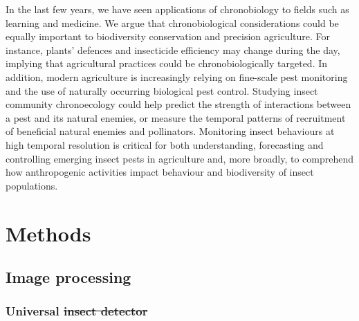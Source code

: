 \documentclass[12pt]{article}
\providecommand{\DIFaddtex}[1]{{\protect\color{blue}\uwave{#1}}} %
\providecommand{\DIFdeltex}[1]{{\protect\color{red}\sout{#1}}}                      %
\providecommand{\DIFaddbegin}{} %
\providecommand{\DIFaddend}{} %
\providecommand{\DIFdelbegin}{} %
\providecommand{\DIFdelend}{} %
\providecommand{\DIFadd}[1]{\texorpdfstring{\DIFaddtex{#1}}{#1}} %
\providecommand{\DIFdel}[1]{\texorpdfstring{\DIFdeltex{#1}}{}} %
\newcommand{\DIFscaledelfig}{0.5}
\newlength{\DIFdelgraphicswidth} %
\newlength{\DIFdelgraphicsheight} %
\newcommand{\DIFaddincludegraphics}[2][]{{\color{blue}\fbox{\DIFOincludegraphics[#1]{#2}}}} %
\newcommand{\DIFdelincludegraphics}[2][]{%
\sbox{\DIFdelgraphicsbox}{\DIFOincludegraphics[#1]{#2}}%
\settoboxwidth{\DIFdelgraphicswidth}{\DIFdelgraphicsbox} %
\settoboxtotalheight{\DIFdelgraphicsheight}{\DIFdelgraphicsbox} %
\scalebox{\DIFscaledelfig}{%
\parbox[b]{\DIFdelgraphicswidth}{\usebox{\DIFdelgraphicsbox}\\[-\baselineskip] \rule{\DIFdelgraphicswidth}{0em}}\llap{\resizebox{\DIFdelgraphicswidth}{\DIFdelgraphicsheight}{%
\setlength{\unitlength}{\DIFdelgraphicswidth}%
\begin{picture}(1,1)%
\thicklines\linethickness{2pt} %
{\color[rgb]{1,0,0}\put(0,0){\framebox(1,1){}}}%
{\color[rgb]{1,0,0}\put(0,0){\line( 1,1){1}}}%
{\color[rgb]{1,0,0}\put(0,1){\line(1,-1){1}}}%
\end{picture}%
}\hspace*{3pt}}} %
} %
\DeclareRobustCommand{\DIFaddbegin}{\DIFOaddbegin \let\includegraphics\DIFaddincludegraphics} %
\DeclareRobustCommand{\DIFaddend}{\DIFOaddend \let\includegraphics\DIFOincludegraphics} %
\DeclareRobustCommand{\DIFdelbegin}{\DIFOdelbegin \let\includegraphics\DIFdelincludegraphics} %
\DeclareRobustCommand{\DIFdelend}{\DIFOaddend \let\includegraphics\DIFOincludegraphics} %
\begin{document}
\begin{linenumbers}
		In the last few years, we have seen applications of chronobiology to fields such as learning\cite{smarr_time_2014} and medicine\cite{cederroth_medicine_2019}. We argue that chronobiological considerations could be equally important to biodiversity conservation and precision agriculture\cite{gottlieb_agro-chronobiology_2019,karapetyan_redox_2018,khyati_insect_2017}. For instance, plants’ defences\cite{goodspeed_arabidopsis_2012,jander_timely_2012} and insecticide efficiency\cite{balmert_time--day_2014,khalid_circadian_2019} may change during the day, implying that agricultural practices could be chronobiologically targeted. In addition, modern agriculture is increasingly relying on fine-scale pest monitoring and the use of naturally occurring biological pest control\cite{gagic_better_2021,tooker_balancing_2020}. Studying insect community chronoecology could help predict the strength of interactions between a pest and its natural enemies, or measure the temporal patterns of recruitment of beneficial natural enemies and pollinators. Monitoring insect behaviours at high temporal resolution is critical for both understanding, forecasting and controlling emerging insect pests in agriculture and, more broadly, to comprehend how anthropogenic activities impact behaviour and biodiversity of insect populations.

		\section*{Methods}

		
		\subsection*{Image processing}

		\subsubsection*{Universal \DIFdelbegin \DIFdel{insect detector}\DIFdelend \DIFaddbegin \DIFadd{Insect Detector}\DIFaddend }

\end{linenumbers}
\end{document}
